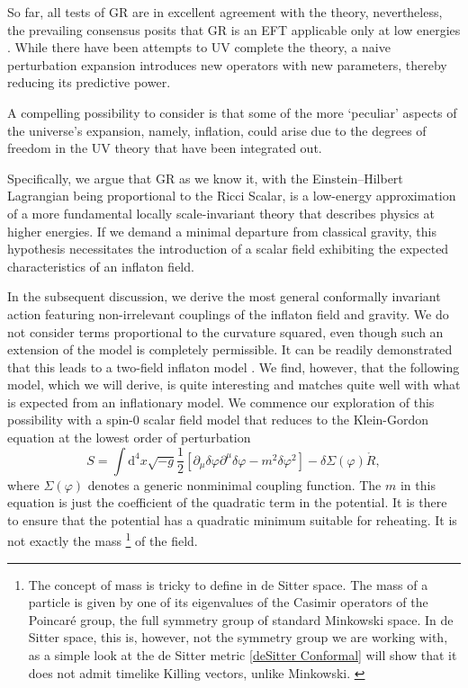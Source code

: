 \documentclass[aps,prd,reprint,preprintnumbers,showpacs,floatfix,nofootinbib,superscript address]{revtex4-2}
\begin{document}
So far, all tests of GR are in excellent agreement with the theory, nevertheless, the prevailing consensus posits that GR is an EFT applicable only at low energies \cite{donoghue_general_1994, burgess_quantum_2004}. While there have been attempts to UV complete the theory, a naive perturbation expansion introduces new operators with new parameters, thereby reducing its predictive power.

A compelling possibility to consider is that some of the more `peculiar' aspects of the universe's expansion, namely, inflation, could arise due to the degrees of freedom in the UV theory that have been integrated out. 

Specifically, we argue that GR as we know it, with the Einstein--Hilbert Lagrangian being proportional to the Ricci Scalar, is a low-energy approximation of a more fundamental locally scale-invariant theory that describes physics at higher energies. If we demand a minimal departure from classical gravity, this hypothesis necessitates the introduction of a scalar field exhibiting the expected characteristics of an inflaton field.

In the subsequent discussion, we derive the most general conformally invariant action featuring non-irrelevant couplings of the inflaton field and gravity. We do not consider terms proportional to the curvature squared, even though such an extension of the model is completely permissible. It can be readily demonstrated that this leads to a two-field inflaton model \cite{whitt_fourth-order_1984}. We find, however, that the following model, which we will derive, is quite interesting and matches quite well with what is expected from an inflationary model. We commence our exploration of this possibility with a spin-0 scalar field model that reduces to the Klein-Gordon equation at the lowest order of perturbation
\begin{equation} \label{25}
    S = \int \mathrm{d}^4 x \sqrt{-g} \frac{1}{2} \left[ \partial_\mu \delta \varphi \partial^\mu \delta \varphi - m^2   \delta\varphi^2   \right] - \delta\Sigma(\varphi) \mathring{R} ,
\end{equation}
where $\Sigma(\varphi)$ denotes a generic nonminimal coupling function. The $m$ in this equation is just the coefficient of the quadratic term in the potential. It is there to ensure that the potential has a quadratic minimum suitable for reheating. It is not exactly the mass \footnote{The concept of mass is tricky to define in de Sitter space. The mass of a particle is given by one of its eigenvalues of the Casimir operators of the Poincaré group, the full symmetry group of standard Minkowski space. In de Sitter space, this is, however, not the symmetry group we are working with, as a simple look at the de Sitter metric \cref{deSitter Conformal} will show that it does not admit timelike Killing vectors, unlike Minkowski. \label{Footnote 1}} of the field.
\end{document}
